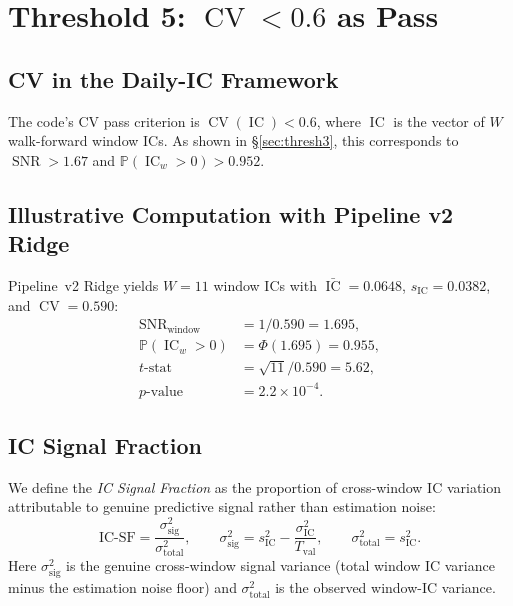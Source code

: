 \documentclass[11pt,a4paper]{article}
\theoremstyle{definition}
\newcommand{\IC}{\operatorname{IC}}
\newcommand{\CV}{\operatorname{CV}}
\newcommand{\Prob}{\mathbb{P}}
\newcommand{\SNR}{\operatorname{SNR}}
\begin{document}
\section{Threshold 5: \texorpdfstring{$\CV < 0.6$}{CV < 0.6} as Pass}
\label{sec:thresh5}

\subsection{CV in the Daily-IC Framework}

The code's CV pass criterion is $\CV(\IC) < 0.6$, where $\IC$ is the
vector of $W$ walk-forward window ICs. As shown in \S\ref{sec:thresh3},
this corresponds to $\SNR > 1.67$ and $\Prob(\IC_{w}>0) > 0.952$.

\subsection{Illustrative Computation with Pipeline v2 Ridge}

Pipeline~v2 Ridge yields $W=11$ window ICs with $\bar{\IC}=0.0648$,
$s_{\IC}=0.0382$, and $\CV=0.590$:
\begin{align}
    \SNR_{\text{window}} &= 1/0.590 = 1.695, \\
    \Prob(\IC_{w} > 0)  &= \Phi(1.695) = 0.955, \\
    t\text{-stat}       &= \sqrt{11}/0.590 = 5.62, \\
    p\text{-value}      &= 2.2 \times 10^{-4}.
\end{align}

\subsection{IC Signal Fraction}

We define the \emph{IC Signal Fraction} as the proportion of cross-window
IC variation attributable to genuine predictive signal rather than
estimation noise:
\begin{equation}
    \text{IC-SF} = \frac{\sigma_{\text{sig}}^{2}}
                          {\sigma_{\text{total}}^{2}},
    \qquad
    \sigma_{\text{sig}}^{2} = s_{\IC}^{2}
                             - \frac{\sigma_{\IC}^{2}}{T_{\text{val}}},
    \qquad
    \sigma_{\text{total}}^{2} = s_{\IC}^{2}.
\end{equation}
Here $\sigma_{\text{sig}}^{2}$ is the genuine cross-window signal
variance (total window IC variance minus the estimation noise floor)
and $\sigma_{\text{total}}^{2}$ is the observed window-IC variance.
\end{document}
